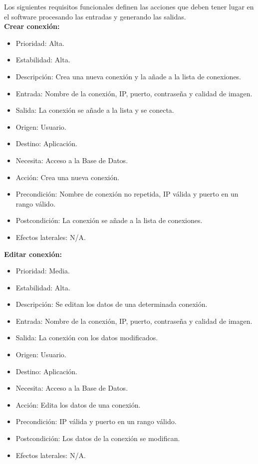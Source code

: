 Los siguientes requisitos funcionales definen las acciones que deben tener lugar en el software procesando las entradas y generando las salidas.\\

\textbf{Crear conexión:}
\begin{itemize}
\item Prioridad: Alta.
\item Estabilidad: Alta.
\item Descripción: Crea una nueva conexión y la añade a la lista de conexiones.
\item Entrada: Nombre de la conexión, IP, puerto, contraseña y calidad de imagen.
\item Salida: La conexión se añade a la lista y se conecta.
\item Origen: Usuario.
\item Destino: Aplicación.
\item Necesita: Acceso a la Base de Datos.
\item Acción: Crea una nueva conexión.
\item Precondición: Nombre de conexión no repetida, IP válida y puerto en un rango válido.
\item Postcondición: La conexión se añade a la lista de conexiones.
\item Efectos laterales: N/A.\\

\end{itemize}

\textbf{Editar conexión:}
\begin{itemize}
\item Prioridad: Media.
\item Estabilidad: Alta.
\item Descripción: Se editan los datos de una determinada conexión.
\item Entrada: Nombre de la conexión, IP, puerto, contraseña y calidad de imagen.
\item Salida: La conexión con los datos modificados.
\item Origen: Usuario.
\item Destino: Aplicación.
\item Necesita: Acceso a la Base de Datos.
\item Acción: Edita los datos de una conexión.
\item Precondición: IP válida y puerto en un rango válido.
\item Postcondición: Los datos de la conexión se modifican.
\item Efectos laterales: N/A.\\

\end{itemize}

